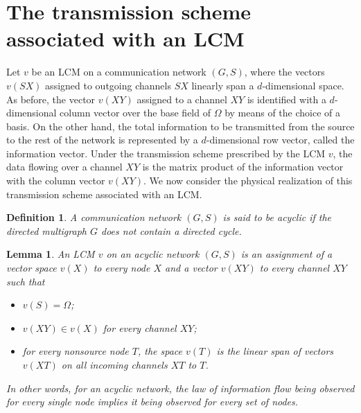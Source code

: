 \documentclass[journal]{IEEEtran}
\newtheorem*{defi}{Definition}
\newtheorem{lemm}[prop]{Lemma}
\begin{document}
\section{The transmission scheme associated with an LCM}\label{sec:scheme}
\par 
Let $v$ be an LCM on a communication network $(G,S)$, where the vectors $v(SX)$ assigned to outgoing channels $SX$ linearly span a $d$-dimensional space. As before, the vector $v(XY)$ assigned to a channel $XY$ is identified with a $d$-dimensional column vector over the base field of $\Omega$ by means of the choice of a basis. On the other hand, the total information to be transmitted from the source to the rest of the network is represented by a $d$-dimensional row vector, called the information vector. Under the transmission scheme prescribed by the LCM $v$, the data flowing over a channel $XY$ is the matrix product of the information vector with the column vector $v(XY)$. We now consider the physical realization of this transmission scheme associated with an LCM.
\begin{defi}
	A communication network $(G,S)$ is said to be 	\emph{acyclic} if the directed multigraph $G$ does not contain a directed cycle.
\end{defi}
\vspace{\baselineskip}
\begin{lemm}
	An LCM $v$ on an acyclic network $(G,S)$ is an assignment of a vector space $v(X)$ to every node $X$ and a vector $v(XY)$ to every channel $XY$ such that
	\begin{itemize}
		\item[1)] $v(S)=\Omega$;
		\item[2)] $v(XY)\in v(X)$ for every channel $XY$;
		\item[3)] for every nonsource node $T$, the space $v(T)$ is the linear span of vectors $v(XT)$ on all incoming channels $XT$ to $T$.
	\end{itemize}
In other words, for an acyclic network, the law of information flow being observed for every single node implies it being observed for every \emph{set} of nodes.
\end{lemm}
\end{document}
